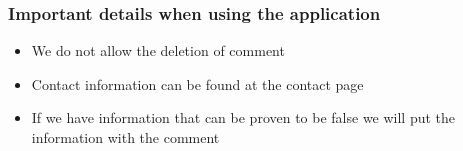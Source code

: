 \documentclass[aspectratio=169]{beamer}
\begin{document}
\begin{frame}
    \frametitle{Important details when using the application}
    \begin{itemize}
        \item We do not allow the deletion of comment
        \item Contact information can be found at the contact page
        \item If we have information that can be proven to be false we will put the information with the comment
    \end{itemize}
\end{frame}
\end{document}
